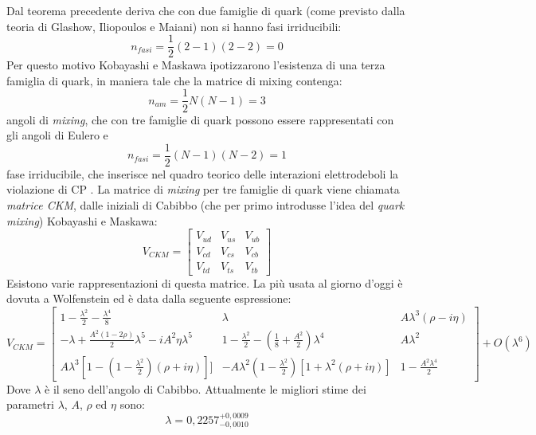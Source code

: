 Dal teorema precedente deriva che con due famiglie di quark (come previsto dalla teoria di Glashow, Iliopoulos e Maiani) non si hanno fasi irriducibili:
\begin{equation}
 n_{fasi} = \frac{1}{2} (2-1)(2-2) = 0 
\end{equation}
Per questo motivo Kobayashi e Maskawa ipotizzarono l'esistenza di una terza famiglia di quark, in maniera tale che la matrice di mixing contenga:
\begin{equation}
 n_{am} = \frac{1}{2}N(N-1) = 3
\end{equation}
angoli di \emph{mixing}, che con tre famiglie di quark possono essere rappresentati con gli angoli di Eulero e 
\begin{equation}
 n_{fasi} = \frac{1}{2}(N-1)(N-2) = 1
\end{equation}
fase irriducibile, che inserisce nel quadro teorico delle interazioni elettrodeboli la violazione di CP \cite{Maiani}.
La matrice di \emph{mixing} per tre famiglie di quark viene chiamata \emph{matrice CKM}, dalle iniziali di Cabibbo (che per primo introdusse
l'idea del \emph{quark mixing}) Kobayashi e Maskawa:
\begin{equation}
  V_{CKM} = \begin{bmatrix} V_{ud} & V_{us} & V_{ub} \\ V_{cd} & V_{cs} & V_{cb} \\ V_{td} & V_{ts} & V_{tb}\end{bmatrix}
\end{equation}
Esistono varie rappresentazioni di questa matrice. La più usata al giorno d'oggi è dovuta a Wolfenstein ed è data dalla seguente espressione:
\begin{equation}
  V_{CKM} = \begin{bmatrix} 1-\frac{\lambda^2}{2} - \frac{\lambda^4}{8}& \lambda & A\lambda^3(\rho - i\eta) \\ -\lambda + \frac{A^2(1-2\rho)}{2}\lambda^5 - iA^2\eta\lambda^5 & 1-\frac{\lambda^2}{2} - (\frac{1}{8}+ \frac{A^2}{2})\lambda^4& A\lambda^2 \\ A\lambda^3[1-(1-\frac{\lambda^2}{2})(\rho + i\eta)]] & -A\lambda^2(1-\frac{\lambda^2}{2})[1+\lambda^2(\rho + i\eta)] & 1- \frac{A^2\lambda^4}{2}\end{bmatrix} + O(\lambda^6)
\end{equation}
Dove $\lambda$ è il seno dell'angolo di Cabibbo. Attualmente le migliori stime dei parametri $\lambda$, $A$, $\rho$ ed $\eta$ sono:
\begin{equation}
\lambda = 0,2257^{+0,0009}_{-0,0010} 
\end{equation}
